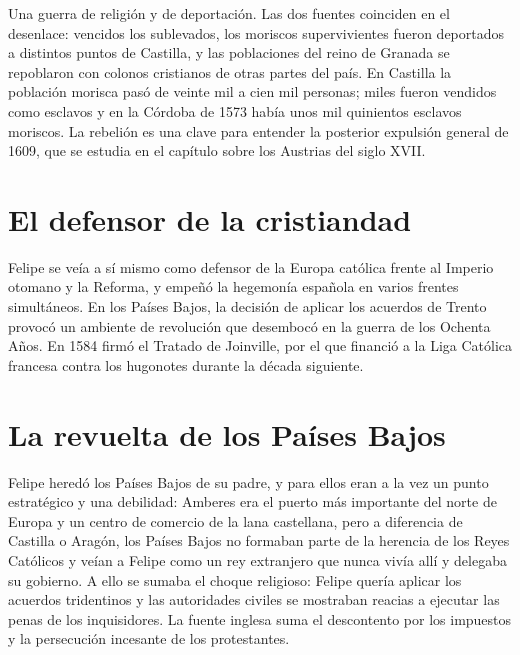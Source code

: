\documentclass{book}
\begin{document}
Una guerra de religión y de deportación. Las dos fuentes coinciden en el desenlace: vencidos los sublevados, los moriscos supervivientes fueron deportados a distintos puntos de Castilla, y las poblaciones del reino de Granada se repoblaron con colonos cristianos de otras partes del país. En Castilla la población morisca pasó de veinte mil a cien mil personas; miles fueron vendidos como esclavos y en la Córdoba de 1573 había unos mil quinientos esclavos moriscos. La rebelión es una clave para entender la posterior expulsión general de 1609, que se estudia en el capítulo sobre los Austrias del siglo XVII.


\section{El defensor de la cristiandad}

Felipe se veía a sí mismo como defensor de la Europa católica frente al Imperio otomano y la Reforma, y empeñó la hegemonía española en varios frentes simultáneos. En los Países Bajos, la decisión de aplicar los acuerdos de Trento provocó un ambiente de revolución que desembocó en la guerra de los Ochenta Años. En 1584 firmó el Tratado de Joinville, por el que financió a la Liga Católica francesa contra los hugonotes durante la década siguiente.


\section{La revuelta de los Países Bajos}

Felipe heredó los Países Bajos de su padre, y para ellos eran a la vez un punto estratégico y una debilidad: Amberes era el puerto más importante del norte de Europa y un centro de comercio de la lana castellana, pero a diferencia de Castilla o Aragón, los Países Bajos no formaban parte de la herencia de los Reyes Católicos y veían a Felipe como un rey extranjero que nunca vivía allí y delegaba su gobierno. A ello se sumaba el choque religioso: Felipe quería aplicar los acuerdos tridentinos y las autoridades civiles se mostraban reacias a ejecutar las penas de los inquisidores. La fuente inglesa suma el descontento por los impuestos y la persecución incesante de los protestantes.
\end{document}
